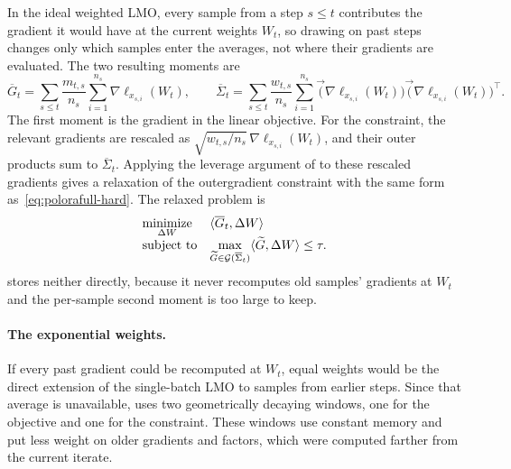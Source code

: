 In the ideal weighted LMO, every sample from a step $s\le t$ contributes
the gradient it would have at the current weights $W_t$, so drawing on past
steps changes only which samples enter the averages, not where their
gradients are evaluated. The two resulting moments are
\[
\overline G_t
  =
  \sum_{s\le t}\frac{m_{t,s}}{n_s}\sum_{i=1}^{n_s}
  \nabla\ell_{x_{s,i}}(W_t),
\qquad
\overline\Sigma_t
  =
  \sum_{s\le t}\frac{w_{t,s}}{n_s}\sum_{i=1}^{n_s}
  \vec(\nabla\ell_{x_{s,i}}(W_t))
  \vec(\nabla\ell_{x_{s,i}}(W_t))^\top .
\]
The first moment is the gradient in the linear objective. For the
constraint, the relevant gradients are rescaled as
$\sqrt{w_{t,s}/n_s}\,\nabla\ell_{x_{s,i}}(W_t)$, and their outer
products sum to $\overline\Sigma_t$. Applying the leverage argument of
 to these rescaled gradients gives a relaxation of
the outergradient constraint with the same form
as~\eqref{eq:polorafull-hard}. The relaxed problem is
\begin{equation}\label{eq:weighted-relaxed-05}
 \begin{array}{ll}
  \underset{\Delta W}{\mathrm{minimize}} &
  \langle \overline G_t, \Delta W \rangle \\[2pt]
  \mbox{subject to} &
  \displaystyle
  \max_{\widetilde{G}\in\mathcal{G}(\overline\Sigma_t)}
  \langle \widetilde{G},\Delta W \rangle\le\tau .
  \end{array}
\end{equation}
 stores neither directly, because it never recomputes old
samples' gradients at $W_t$ and the per-sample second moment is too large
to keep.

\paragraph{The exponential weights.}
If every past gradient could be recomputed at $W_t$, equal weights would be
the direct extension of the single-batch LMO to samples from earlier steps.
Since that average is unavailable,  uses two geometrically decaying windows,
one for the objective and one for the constraint. These windows use
constant memory and put less weight on older gradients and factors, which
were computed farther from the current iterate.

